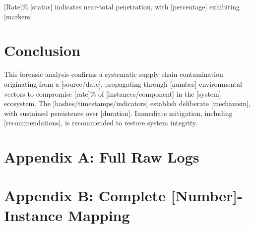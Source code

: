 \documentclass[12pt,a4paper]{article}
\begin{document}
[Rate]\% [status] indicates near-total penetration, with [percentage] exhibiting [markers].

\section{Conclusion}
This forensic analysis confirms a systematic supply chain contamination originating from a [source/date], propagating through [number] environmental vectors to compromise [rate]\% of [instances/component] in the [system] ecosystem. The [hashes/timestamps/indicators] establish deliberate [mechanism], with sustained persistence over [duration]. Immediate mitigation, including [recommendations], is recommended to restore system integrity.

\section*{Appendix A: Full Raw Logs}

\section*{Appendix B: Complete [Number]-Instance Mapping}
\end{document}
